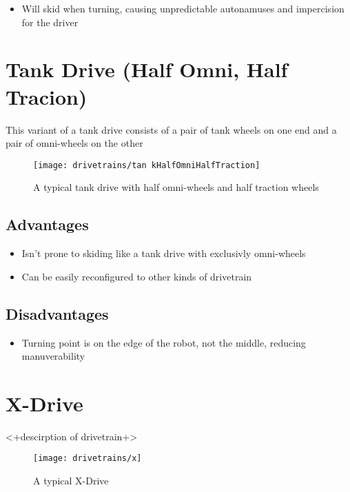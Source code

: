 \documentclass[../../main.tex]{subfiles}
\begin{document}
\begin{itemize} \item Will skid when turning, causing unpredictable autonamuses and impercision for the driver \end{itemize} 

\section{Tank Drive (Half Omni, Half Tracion)} 

This variant of a tank drive consists of a pair of tank wheels on one end and a pair of omni-wheels on the other 

\begin{figure}[h] \centering 

	\texttt{[image: drivetrains/tan kHalfOmniHalfTraction]} \caption{A typical tank drive with half omni-wheels and half traction wheels} \label{fig:drivetrainTankHalfHalf} \end{figure} 

\subsection{Advantages} 

\begin{itemize} \item Isn't prone to skiding like a tank drive with exclusivly omni-wheels \item Can be easily reconfigured to other kinds of drivetrain \end{itemize} 

\subsection{Disadvantages} 

\begin{itemize} \item Turning point is on the edge of the robot, not the middle, reducing manuverability \end{itemize} 

\section{X-Drive} 

<+descirption of drivetrain+> \begin{figure}[h] \centering 

	\texttt{[image: drivetrains/x]} \caption{A typical X-Drive} \label{fig:drivetrainX} \end{figure} 
\end{document}

